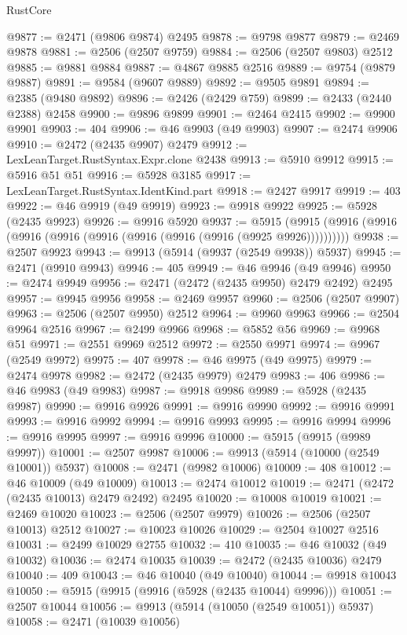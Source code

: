 \begin{lexlean}{RustCore}
\begin{coremodule}
@9877 := @2471 (@9806 @9874) @2495
@9878 := @9798 @9877
@9879 := @2469 @9878
@9881 := @2506 (@2507 @9759)
@9884 := @2506 (@2507 @9803) @2512
@9885 := @9881 @9884
@9887 := @4867 @9885 @2516
@9889 := @9754 (@9879 @9887)
@9891 := @9584 (@9607 @9889)
@9892 := @9505 @9891
@9894 := @2385 (@9480 @9892)
@9896 := @2426 (@2429 @759)
@9899 := @2433 (@2440 @2388) @2458
@9900 := @9896 @9899
@9901 := @2464 @2415
@9902 := @9900 @9901
@9903 := 404
@9906 := @46 @9903 (@49 @9903)
@9907 := @2474 @9906
@9910 := @2472 (@2435 @9907) @2479
@9912 := LexLeanTarget.RustSyntax.Expr.clone @2438
@9913 := @5910 @9912
@9915 := @5916 @51 @51
@9916 := @5928 @3185
@9917 := LexLeanTarget.RustSyntax.IdentKind.part
@9918 := @2427 @9917
@9919 := 403
@9922 := @46 @9919 (@49 @9919)
@9923 := @9918 @9922
@9925 := @5928 (@2435 @9923)
@9926 := @9916 @5920
@9937 := @5915 (@9915 (@9916 (@9916 (@9916 (@9916 (@9916 (@9916 (@9916 (@9916 (@9925 @9926))))))))))
@9938 := @2507 @9923
@9943 := @9913 (@5914 (@9937 (@2549 @9938)) @5937)
@9945 := @2471 (@9910 @9943)
@9946 := 405
@9949 := @46 @9946 (@49 @9946)
@9950 := @2474 @9949
@9956 := @2471 (@2472 (@2435 @9950) @2479 @2492) @2495
@9957 := @9945 @9956
@9958 := @2469 @9957
@9960 := @2506 (@2507 @9907)
@9963 := @2506 (@2507 @9950) @2512
@9964 := @9960 @9963
@9966 := @2504 @9964 @2516
@9967 := @2499 @9966
@9968 := @5852 @56
@9969 := @9968 @51
@9971 := @2551 @9969 @2512
@9972 := @2550 @9971
@9974 := @9967 (@2549 @9972)
@9975 := 407
@9978 := @46 @9975 (@49 @9975)
@9979 := @2474 @9978
@9982 := @2472 (@2435 @9979) @2479
@9983 := 406
@9986 := @46 @9983 (@49 @9983)
@9987 := @9918 @9986
@9989 := @5928 (@2435 @9987)
@9990 := @9916 @9926
@9991 := @9916 @9990
@9992 := @9916 @9991
@9993 := @9916 @9992
@9994 := @9916 @9993
@9995 := @9916 @9994
@9996 := @9916 @9995
@9997 := @9916 @9996
@10000 := @5915 (@9915 (@9989 @9997))
@10001 := @2507 @9987
@10006 := @9913 (@5914 (@10000 (@2549 @10001)) @5937)
@10008 := @2471 (@9982 @10006)
@10009 := 408
@10012 := @46 @10009 (@49 @10009)
@10013 := @2474 @10012
@10019 := @2471 (@2472 (@2435 @10013) @2479 @2492) @2495
@10020 := @10008 @10019
@10021 := @2469 @10020
@10023 := @2506 (@2507 @9979)
@10026 := @2506 (@2507 @10013) @2512
@10027 := @10023 @10026
@10029 := @2504 @10027 @2516
@10031 := @2499 @10029 @2755
@10032 := 410
@10035 := @46 @10032 (@49 @10032)
@10036 := @2474 @10035
@10039 := @2472 (@2435 @10036) @2479
@10040 := 409
@10043 := @46 @10040 (@49 @10040)
@10044 := @9918 @10043
@10050 := @5915 (@9915 (@9916 (@5928 (@2435 @10044) @9996)))
@10051 := @2507 @10044
@10056 := @9913 (@5914 (@10050 (@2549 @10051)) @5937)
@10058 := @2471 (@10039 @10056)

\end{coremodule}
\end{lexlean}
